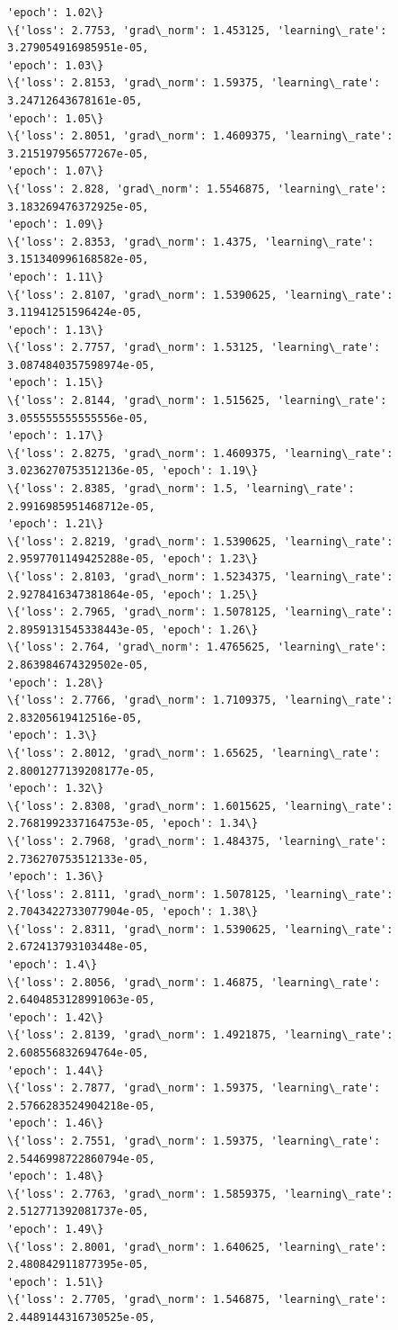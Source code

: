 \documentclass[11pt]{article}
\begin{document}
\begin{Verbatim}[commandchars=\\\{\}]
'epoch': 1.02\}
\{'loss': 2.7753, 'grad\_norm': 1.453125, 'learning\_rate': 3.279054916985951e-05,
'epoch': 1.03\}
\{'loss': 2.8153, 'grad\_norm': 1.59375, 'learning\_rate': 3.24712643678161e-05,
'epoch': 1.05\}
\{'loss': 2.8051, 'grad\_norm': 1.4609375, 'learning\_rate': 3.215197956577267e-05,
'epoch': 1.07\}
\{'loss': 2.828, 'grad\_norm': 1.5546875, 'learning\_rate': 3.183269476372925e-05,
'epoch': 1.09\}
\{'loss': 2.8353, 'grad\_norm': 1.4375, 'learning\_rate': 3.151340996168582e-05,
'epoch': 1.11\}
\{'loss': 2.8107, 'grad\_norm': 1.5390625, 'learning\_rate': 3.11941251596424e-05,
'epoch': 1.13\}
\{'loss': 2.7757, 'grad\_norm': 1.53125, 'learning\_rate': 3.0874840357598974e-05,
'epoch': 1.15\}
\{'loss': 2.8144, 'grad\_norm': 1.515625, 'learning\_rate': 3.055555555555556e-05,
'epoch': 1.17\}
\{'loss': 2.8275, 'grad\_norm': 1.4609375, 'learning\_rate':
3.0236270753512136e-05, 'epoch': 1.19\}
\{'loss': 2.8385, 'grad\_norm': 1.5, 'learning\_rate': 2.9916985951468712e-05,
'epoch': 1.21\}
\{'loss': 2.8219, 'grad\_norm': 1.5390625, 'learning\_rate':
2.9597701149425288e-05, 'epoch': 1.23\}
\{'loss': 2.8103, 'grad\_norm': 1.5234375, 'learning\_rate':
2.9278416347381864e-05, 'epoch': 1.25\}
\{'loss': 2.7965, 'grad\_norm': 1.5078125, 'learning\_rate':
2.8959131545338443e-05, 'epoch': 1.26\}
\{'loss': 2.764, 'grad\_norm': 1.4765625, 'learning\_rate': 2.863984674329502e-05,
'epoch': 1.28\}
\{'loss': 2.7766, 'grad\_norm': 1.7109375, 'learning\_rate': 2.83205619412516e-05,
'epoch': 1.3\}
\{'loss': 2.8012, 'grad\_norm': 1.65625, 'learning\_rate': 2.8001277139208177e-05,
'epoch': 1.32\}
\{'loss': 2.8308, 'grad\_norm': 1.6015625, 'learning\_rate':
2.7681992337164753e-05, 'epoch': 1.34\}
\{'loss': 2.7968, 'grad\_norm': 1.484375, 'learning\_rate': 2.736270753512133e-05,
'epoch': 1.36\}
\{'loss': 2.8111, 'grad\_norm': 1.5078125, 'learning\_rate':
2.7043422733077904e-05, 'epoch': 1.38\}
\{'loss': 2.8311, 'grad\_norm': 1.5390625, 'learning\_rate': 2.672413793103448e-05,
'epoch': 1.4\}
\{'loss': 2.8056, 'grad\_norm': 1.46875, 'learning\_rate': 2.6404853128991063e-05,
'epoch': 1.42\}
\{'loss': 2.8139, 'grad\_norm': 1.4921875, 'learning\_rate': 2.608556832694764e-05,
'epoch': 1.44\}
\{'loss': 2.7877, 'grad\_norm': 1.59375, 'learning\_rate': 2.5766283524904218e-05,
'epoch': 1.46\}
\{'loss': 2.7551, 'grad\_norm': 1.59375, 'learning\_rate': 2.5446998722860794e-05,
'epoch': 1.48\}
\{'loss': 2.7763, 'grad\_norm': 1.5859375, 'learning\_rate': 2.512771392081737e-05,
'epoch': 1.49\}
\{'loss': 2.8001, 'grad\_norm': 1.640625, 'learning\_rate': 2.480842911877395e-05,
'epoch': 1.51\}
\{'loss': 2.7705, 'grad\_norm': 1.546875, 'learning\_rate': 2.4489144316730525e-05,

\end{Verbatim}
\end{document}
